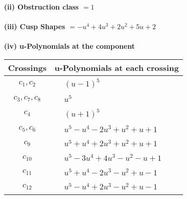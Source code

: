 \documentclass[1p]{elsarticle_modified}
\theoremstyle{definition}
\begin{document}
\flushleft \textbf{(ii) Obstruction class $= 1$}\\~\\
\flushleft \textbf{(iii) Cusp Shapes $= - u^4+4 u^3+2 u^2+5 u+2$}\\~\\
\newpage\renewcommand{\arraystretch}{1}
\flushleft \textbf{(iv) u-Polynomials at the component}\newline \\
\begin{tabular}{m{50pt}|m{274pt}}
Crossings & \hspace{64pt}u-Polynomials at each crossing \\
\hline $$\begin{aligned}c_{1},c_{2}\end{aligned}$$&$\begin{aligned}
&(u-1)^5
\end{aligned}$\\
\hline $$\begin{aligned}c_{3},c_{7},c_{8}\end{aligned}$$&$\begin{aligned}
&u^5
\end{aligned}$\\
\hline $$\begin{aligned}c_{4}\end{aligned}$$&$\begin{aligned}
&(u+1)^5
\end{aligned}$\\
\hline $$\begin{aligned}c_{5},c_{6}\end{aligned}$$&$\begin{aligned}
&u^5- u^4-2 u^3+u^2+u+1
\end{aligned}$\\
\hline $$\begin{aligned}c_{9}\end{aligned}$$&$\begin{aligned}
&u^5+u^4+2 u^3+u^2+u+1
\end{aligned}$\\
\hline $$\begin{aligned}c_{10}\end{aligned}$$&$\begin{aligned}
&u^5-3 u^4+4 u^3- u^2- u+1
\end{aligned}$\\
\hline $$\begin{aligned}c_{11}\end{aligned}$$&$\begin{aligned}
&u^5+u^4-2 u^3- u^2+u-1
\end{aligned}$\\
\hline $$\begin{aligned}c_{12}\end{aligned}$$&$\begin{aligned}
&u^5- u^4+2 u^3- u^2+u-1
\end{aligned}$\\
\hline
\end{tabular}\\~\\
\end{document}
